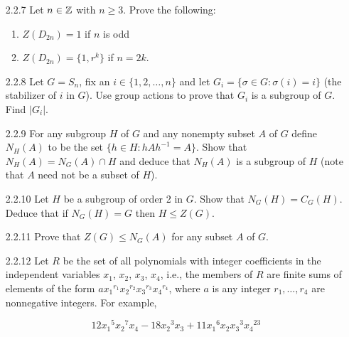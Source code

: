 \begin{enumerate}
   \item[2.2.7]   Let $n \in \mathbb{Z}$ with $n \ge 3$. Prove the following:
                  \begin{enumerate}
                     \item $Z(D_{2n}) = 1$ if $n$ is odd
                     \item $Z(D_{2n}) = \{1, r^k\}$ if $n = 2k$.
                  \end{enumerate}
   \item[2.2.8]   Let $G = S_n$, fix an $i \in \{1, 2, \ldots, n\}$ and let
                  $G_i = \{\sigma \in G : \sigma(i) = i\}$ (the stabilizer of
                  $i$ in $G$). Use group actions to prove that $G_i$ is a
                  subgroup of $G$. Find $|G_i|$.
   \item[2.2.9]   For any subgroup $H$ of $G$ and any nonempty subset $A$ of $G$
                  define $N_H(A)$ to be the set $\{h \in H : hAh^{-1} = A\}$.
                  Show that $N_H(A) = N_G(A) \cap H$ and deduce that $N_H(A)$ is
                  a subgroup of $H$ (note that $A$ need not be a subset of $H$).
   \item[2.2.10]  Let $H$ be a subgroup of order 2 in $G$. Show that
                  $N_G(H) = C_G(H)$. Deduce that if $N_G(H) = G$ then
                  $H \le Z(G)$.
   \item[2.2.11]  Prove that $Z(G) \le N_G(A)$ for any subset $A$ of $G$.
   \item[2.2.12]  Let $R$ be the set of all polynomials with integer
                  coefficients in the independent variables $x_1$, $x_2$, $x_3$,
                  $x_4$, i.e., the members of $R$ are finite sums of elements of
                  the form ${ax_1}^{r_1}{x_2}^{r_2}{x_3}^{r_3}{x_4}^{r_4}$,
                  where $a$ is any integer $r_1, \ldots, r_4$ are nonnegative
                  integers. For example,

                  \begin{equation} \label{2_2_12_1}
                     12{x_1}^5{x_2}^7x_4 - 18{x_2}^3x_3 +
                        11{x_1}^6x_2{x_3}^3{x_4}^{23}
                  \end{equation}


\end{enumerate}
